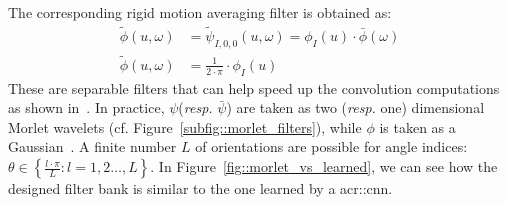                 The corresponding rigid motion averaging filter is obtained as:
                \begin{align}
                    \label{eq::roto-translation_low_pass}
                    \tilde{\phi}(u, \omega) &= \tilde{\psi}_{I, 0, 0}(u, \omega) = \phi_I(u) \cdot \bar\phi(\omega) \nonumber \\
                    \tilde{\phi}(u, \omega) &= \frac{1}{2\cdot\pi} \cdot \phi_I(u)
                \end{align}
                These are separable filters that can help speed up the convolution computations as shown in~\textcite{sifre2013rotation}.
                In practice, $\psi$(\textit{resp.} $\bar\psi$) are taken as two (\textit{resp.} one) dimensional Morlet wavelets (cf. Figure~\ref{subfig::morlet_filters}), while $\phi$ is taken as a Gaussian~\parencite{sifre2013rotation,bruna2013invariant,oyallon2015deep}.
                A finite number $L$ of orientations are possible for angle indices: $\theta \in \left\{\frac{l\cdot\pi}{L}: l=1,2\dots,L\right\}$.
                In Figure~\ref{fig::morlet_vs_learned}, we can see how the designed filter bank is similar to the one learned by a \gls{acr::cnn}.
